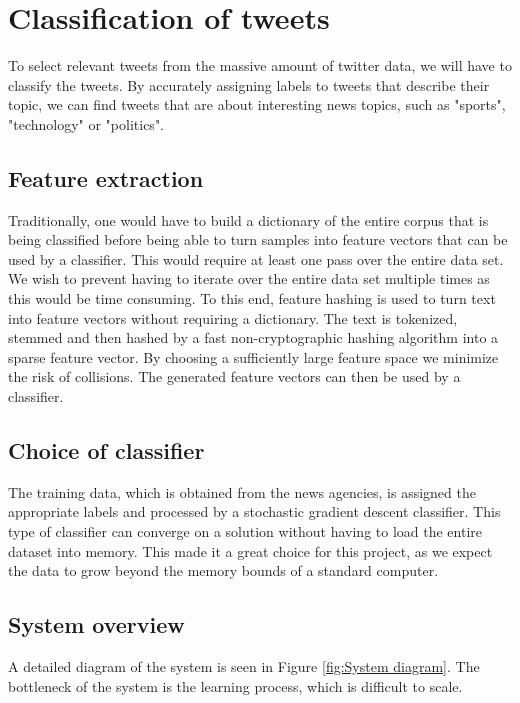 \documentclass{llncs}
\begin{document}

\section{Classification of tweets}
To select relevant tweets from the massive amount of twitter data, we will have to classify the tweets. By accurately assigning labels to tweets that describe their topic, we can find tweets that are about interesting news topics, such as "sports", "technology" or "politics".

\subsection{Feature extraction}
Traditionally, one would have to build a dictionary of the entire corpus that is being classified before being able to turn samples into feature vectors that can be used by a classifier. This would require at least one pass over the entire data set. We wish to prevent having to iterate over the entire data set multiple times as this would be time consuming. To this end, feature hashing is used to turn text into feature vectors without requiring a dictionary. The text is tokenized, stemmed and then hashed by a fast non-cryptographic hashing algorithm into a sparse feature vector. By choosing a sufficiently large feature space we minimize the risk of collisions. The generated feature vectors can then be used by a classifier.

\subsection{Choice of classifier}
The training data, which is obtained from the news agencies, is assigned the appropriate labels and processed by a stochastic gradient descent classifier. This type of classifier can converge on a solution without having to load the entire dataset into memory. This made it a great choice for this project, as we expect the data to grow beyond the memory bounds of a standard computer.

\subsection{System overview}
A detailed diagram of the system is seen in Figure \ref{fig:System diagram}. The bottleneck of the system is the learning process, which is difficult to scale.
\end{document}
